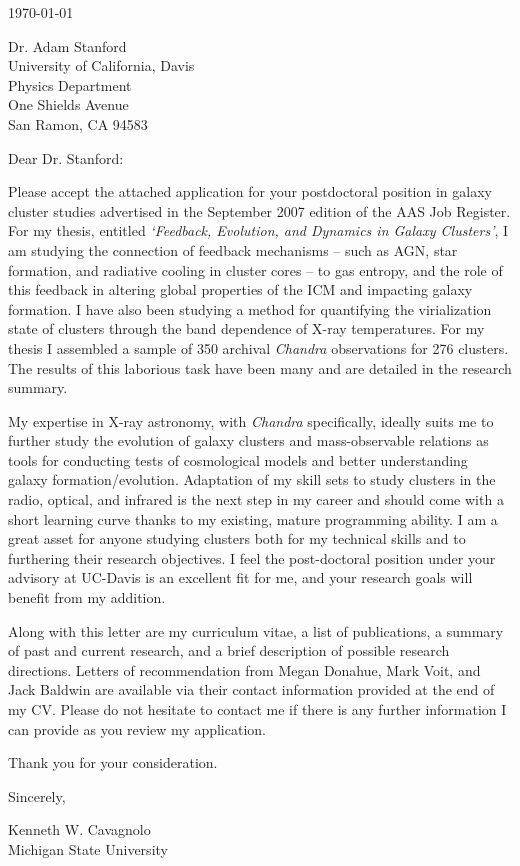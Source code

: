 \documentclass[11pt]{article}
\begin{document}
\today

Dr. Adam Stanford\\
University of California, Davis\\
Physics Department\\
One Shields Avenue\\
San Ramon, CA 94583

Dear Dr. Stanford:

Please accept the attached application for your postdoctoral
position in galaxy cluster studies advertised in the September 2007 edition
of the AAS Job Register. For my thesis, entitled {\textit{`Feedback,
Evolution, and Dynamics in Galaxy Clusters'}}, I am studying
the connection of feedback mechanisms -- such as AGN, star formation, and
radiative cooling in cluster cores -- to gas entropy, and the role
of this feedback in altering global properties of the ICM and 
impacting galaxy formation. I have also been studying a method for
quantifying the virialization state of clusters through the band
dependence of X-ray temperatures. For my thesis I assembled a sample
of 350 archival {\textit{Chandra}} observations for 276 clusters. The
results of this laborious task have been many and are detailed in the
research summary.

My expertise in X-ray astronomy, with {\textit{Chandra}}
specifically, ideally suits me to further study the evolution of
galaxy clusters and mass-observable relations as tools for
conducting tests of cosmological models and better understanding galaxy
formation/evolution. Adaptation of my skill sets to study clusters
in the radio, optical, and infrared is the next step in my
career and should come with a short learning curve thanks to my
existing, mature programming ability. I am a great asset for anyone
studying clusters both for my technical skills and to furthering
their research objectives. I feel the post-doctoral position under your
advisory at UC-Davis is an excellent fit for me, and your research
goals will benefit from my addition.

Along with this letter are my curriculum vitae, a list of
publications, a summary of past and current research, and a brief
description of possible research directions. Letters of
recommendation from Megan Donahue, Mark Voit, and Jack Baldwin
are available via their contact information provided at the end of my
CV. Please do not hesitate to contact me if there is any
further information I can provide as you review my application.

Thank you for your consideration.

Sincerely,\\
\begin{minipage}{7.5in}
\end{minipage}
Kenneth W. Cavagnolo\\
Michigan State University
\end{document}

